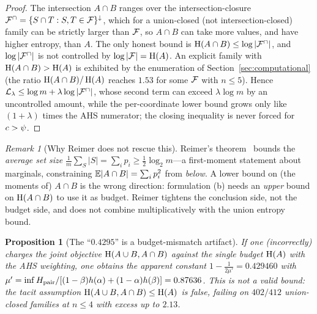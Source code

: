 \documentclass[11pt]{amsart}
\newtheorem{proposition}[theorem]{Proposition}
\theoremstyle{definition}
\theoremstyle{remark}
\newtheorem{remark}[theorem]{Remark}
\begin{document}
\begin{proof}
The intersection $A\cap B$ ranges over the intersection-closure
$\mathcal{F}^\cap=\{S\cap T:S,T\in\mathcal{F}\}^{\downarrow}$, which for a union-closed (not
intersection-closed) family can be strictly larger than $\mathcal{F}$, so $A\cap B$ can
take more values, and have higher entropy, than $A$. The only honest bound is
$\operatorname{H}(A\cap B)\le\log|\mathcal{F}^\cap|$, and $\log|\mathcal{F}^\cap|$ is not controlled by
$\log|\mathcal{F}|=\operatorname{H}(A)$. An explicit family with $\operatorname{H}(A\cap B)>\operatorname{H}(A)$ is exhibited by
the enumeration of Section~\ref{sec:computational} (the ratio
$\operatorname{H}(A\cap B)/\operatorname{H}(A)$ reaches $1.53$ for some $\mathcal{F}$ with $n\le 5$).
Hence $\mathcal L_\lambda\le\log m+\lambda\log|\mathcal{F}^\cap|$, whose second term can
exceed $\lambda\log m$ by an uncontrolled amount, while the per-coordinate lower
bound grows only like $(1+\lambda)$ times the AHS numerator; the closing
inequality is never forced for $c>\psi$.
\end{proof}

\begin{remark}[Why Reimer does not rescue this]
Reimer's theorem~\cite{reimer2003} bounds the \emph{average set size}
$\frac1m\sum_S|S|=\sum_i p_i\ge\tfrac12\log_2 m$---a first-moment statement about
marginals, constraining $\mathbb{E}|A\cap B|=\sum_i p_i^2$ from \emph{below}. A lower
bound on (the moments of) $A\cap B$ is the wrong direction: formulation (b) needs
an \emph{upper} bound on $\operatorname{H}(A\cap B)$ to use it as budget. Reimer tightens the
conclusion side, not the budget side, and does not combine multiplicatively with
the union entropy bound.
\end{remark}

\begin{proposition}[The ``$0.4295$'' is a budget-mismatch artifact]\label{prop:artifact}
If one (incorrectly) charges the joint objective $\operatorname{H}(A\cup B,A\cap B)$ against
the \emph{single} budget $\operatorname{H}(A)$ with the AHS weighting, one obtains the apparent
constant $1-\tfrac{1}{2\mu'}=0.429460$ with
$\mu'=\inf H_{\mathrm{pair}}/[(1-\beta)h(\alpha)+(1-\alpha)h(\beta)]=0.87636$.
This is \emph{not} a valid bound: the tacit assumption $\operatorname{H}(A\cup B,A\cap B)\le
\operatorname{H}(A)$ is false, failing on $402/412$ union-closed families at $n\le 4$ with
excess up to $2.13$.
\end{proposition}
\end{document}
